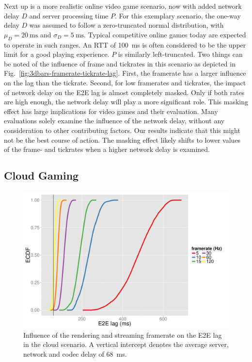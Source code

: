 Next up is a more realistic online video game scenario, now with added network delay $D$ and server processing time $P$. For this exemplary scenario, the one-way delay $D$ was assumed to follow a zero-truncated normal distribution, with $\mu_D = \SI{20}{\milli\second}$ and $\sigma_D = \SI{5}{\milli\second}$. Typical competitive online games today are expected to operate in such ranges. An \acrshort{RTT} of \SI{100}{\milli\second} is often considered to be the upper limit for a good playing experience. $P$ is similarly left-truncated. Two things can be noted of the influence of frame and tickrates in this scenario as depicted in Fig.~\ref{fig:3dbars-framerate-tickrate-lag}. First, the framerate has a larger influence on the lag than the tickrate. Second, for low framerates and tickrates, the impact of network delay on the \gls{E2E} lag is almost completely masked. Only if both rates are high enough, the network delay will play a more significant role. This masking effect has large implications for video games and their evaluation. Many evaluations solely examine the influence of the network delay, without any consideration to other contributing factors. Our results indicate that this might not be the best course of action. The masking effect likely shifts to lower values of the frame- and tickrates when a higher network delay is examined.



\subsection{Cloud Gaming}

\begin{figure}[!t]
	\centering
	\includegraphics[width=1.0\columnwidth]{../../../simulation/visualization/cloudgaming-lag-cdf.pdf}
	\caption{Influence of the rendering and streaming framerate on the \gls{E2E} lag in the cloud scenario. A vertical intercept denotes the average server, network and codec delay of \SI{68}{\milli\second}.}
\label{fig:cloud-e2e-delay-sim}
\end{figure}

